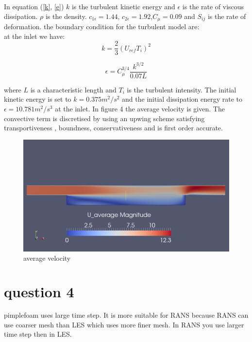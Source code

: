 \documentclass[10pt,a4paper]{report}
\begin{document}
In equation (\ref{k}, \ref{e}) $k$ is the turbulent kinetic energy and $\epsilon$ is the rate of  viscous dissipation. $ \rho$ is the density.
$c_{1\epsilon}= 1.44$, $c_{2\epsilon}= 1.92$,$C_{\mu}= 0.09$ and $ S_{ij}$ is the rate of deformation.
the boundary condition for the turbulent model are:\\
at the inlet we have:
\begin{equation}
k = \frac{2}{3}(U_{ref}T_{i})^{2} \nonumber
\end{equation}

\begin{equation}
\epsilon = C_{\mu}^{3/4}\frac{k^{3/2}}{0.07L}\nonumber
\end{equation}

where $L$ is a characteristic length and $T_{i}$ is the turbulent intensity. The initial kinetic energy is set to $k= 0.375 m^{2}/s^{2}$ and the initial dissipation energy rate to $\epsilon = 10.781 m^{2}/s^{3}$ at the inlet.
In figure 4 the average velocity is given. The convective term is discretised by using an upwing scheme satisfying transportiveness , boundness, conservativeness and is first order accurate. 
\begin{figure}[H]
  \caption{average velocity}
  \centering
    \includegraphics[width=1\textwidth]{U_average_pimpleFoam.png}
\end{figure}


\section{question 4}
pimplefoam uses large time step. It is more suitable for RANS because RANS can use coarser mesh than LES which uses more finer mesh. In RANS you use larger time step then in LES.
\end{document}
